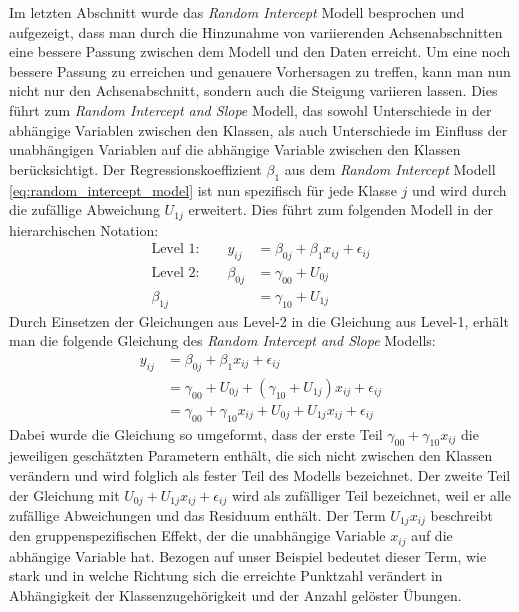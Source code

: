\documentclass[12pt, a4paper]{article}\usepackage[]{graphicx}\usepackage[]{color}
\begin{document}
Im letzten Abschnitt wurde das \textit{Random Intercept} Modell besprochen und aufgezeigt, dass man durch die Hinzunahme von variierenden Achsenabschnitten eine bessere Passung zwischen dem Modell und den Daten erreicht. Um eine noch bessere Passung zu erreichen und genauere Vorhersagen zu treffen, kann man nun nicht nur den Achsenabschnitt, sondern auch die Steigung variieren lassen. Dies führt zum \textit{Random Intercept and Slope} Modell, das sowohl Unterschiede in der abhängige Variablen zwischen den Klassen, als auch Unterschiede im Einfluss der unabhängigen Variablen auf die abhängige Variable zwischen den Klassen berücksichtigt. Der Regressionskoeffizient $\beta_{1}$ aus dem \textit{Random Intercept} Modell \eqref{eq:random_intercept_model} ist nun spezifisch für jede Klasse $j$ und wird durch die zufällige Abweichung $U_{1j}$ erweitert. Dies führt zum folgenden Modell in der hierarchischen Notation:
\begin{equation} \label{eq:random_intercept_slope_model}
\begin{split}	
 \text{Level 1:}  \qquad y_{ij} & = \beta_{0j} + \beta_{1}x_{ij} + \epsilon_{ij}\\
 \text{Level 2:} \qquad \beta_{0j} & = \gamma_{00} + U_{0j}\\
 \beta_{1j} & = \gamma_{10} + U_{1j}
\end{split}	
\end{equation} 
Durch Einsetzen der Gleichungen aus Level-2 in die Gleichung aus Level-1, erhält man die folgende Gleichung des \textit{Random Intercept and Slope} Modells:
\begin{equation} \label{eq:flat_random_intercept_slope_model}
\begin{split}	
y_{ij} & = \beta_{0j} + \beta_{1}x_{ij} + \epsilon_{ij}\\
& = \gamma_{00} + U_{0j} + (\gamma_{10} + U_{1j})x_{ij} + \epsilon_{ij}\\
& = \gamma_{00} + \gamma_{10}x_{ij} + U_{0j} + U_{1j}x_{ij} + \epsilon_{ij}
\end{split}	
\end{equation} 
Dabei wurde die Gleichung so umgeformt, dass der erste Teil $\gamma_{00} + \gamma_{10}x_{ij}$ die jeweiligen geschätzten Parametern enthält, die sich nicht zwischen den Klassen verändern und wird folglich als fester Teil des Modells bezeichnet. Der zweite Teil der Gleichung mit $U_{0j} + U_{1j}x_{ij} + \epsilon_{ij}$ wird als zufälliger Teil bezeichnet, weil er alle zufällige Abweichungen und das Residuum enthält. Der Term $U_{1j}x_{ij}$ beschreibt den gruppenspezifischen Effekt, der die unabhängige Variable $x_{ij}$ auf die abhängige Variable hat. Bezogen auf unser Beispiel bedeutet dieser Term, wie stark und in welche Richtung sich die erreichte Punktzahl verändert in Abhängigkeit der Klassenzugehörigkeit und der Anzahl gelöster Übungen. 
\end{document}
